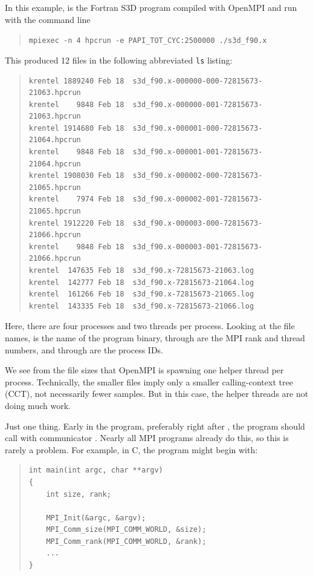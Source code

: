 \documentclass[11pt,letterpaper]{report}
\begin{document}
\answer{}
In this example,  is the Fortran S3D program compiled with OpenMPI and run with the command line
%
\begin{quote}
  \verb|mpiexec -n 4 hpcrun -e PAPI_TOT_CYC:2500000 ./s3d_f90.x|
\end{quote}
%
This produced 12 files in the following abbreviated \texttt{ls} listing:
%
\begin{quote}
\begin{verbatim}
krentel 1889240 Feb 18  s3d_f90.x-000000-000-72815673-21063.hpcrun
krentel    9848 Feb 18  s3d_f90.x-000000-001-72815673-21063.hpcrun
krentel 1914680 Feb 18  s3d_f90.x-000001-000-72815673-21064.hpcrun
krentel    9848 Feb 18  s3d_f90.x-000001-001-72815673-21064.hpcrun
krentel 1908030 Feb 18  s3d_f90.x-000002-000-72815673-21065.hpcrun
krentel    7974 Feb 18  s3d_f90.x-000002-001-72815673-21065.hpcrun
krentel 1912220 Feb 18  s3d_f90.x-000003-000-72815673-21066.hpcrun
krentel    9848 Feb 18  s3d_f90.x-000003-001-72815673-21066.hpcrun
krentel  147635 Feb 18  s3d_f90.x-72815673-21063.log
krentel  142777 Feb 18  s3d_f90.x-72815673-21064.log
krentel  161266 Feb 18  s3d_f90.x-72815673-21065.log
krentel  143335 Feb 18  s3d_f90.x-72815673-21066.log
\end{verbatim}
\end{quote}
%
Here, there are four processes and two threads per process.
Looking at the file names,  is the name of the program binary,  through  are the MPI rank and thread numbers, and  through  are the process IDs.

We see from the file sizes that OpenMPI is spawning one helper thread per process.
Technically, the smaller  files imply only a smaller calling-context tree (CCT), not necessarily fewer samples.
But in this case, the helper threads are not doing much work.


\vspace{1ex}


\answer{}
Just one thing.
Early in the program, preferably right after , the program should call  with communicator .
Nearly all MPI programs already do this, so this is rarely a problem.
For example, in C, the program might begin with:
%
\begin{quote}
\begin{verbatim}
int main(int argc, char **argv)
{
    int size, rank;

    MPI_Init(&argc, &argv);
    MPI_Comm_size(MPI_COMM_WORLD, &size);
    MPI_Comm_rank(MPI_COMM_WORLD, &rank);
    ...
}
\end{verbatim}
\end{quote}
\end{document}
